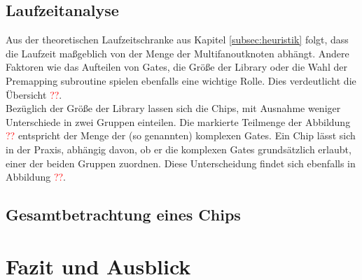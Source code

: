 \documentclass[11pt, a4paper, german]{article}
\begin{document}
 
 \subsection{Laufzeitanalyse}
 \label{subsec:laufzeitanalyse}
Aus der theoretischen Laufzeitschranke aus Kapitel \ref{subsec:heuristik} folgt, dass die Laufzeit maßgeblich von der Menge der Multifanoutknoten abhängt. Andere Faktoren wie das Aufteilen von Gates, die Größe der Library oder die Wahl der Premapping subroutine spielen ebenfalls eine wichtige Rolle. Dies verdeutlicht die Übersicht \textcolor{red}{??}.\\
 Bezüglich der Größe der Library lassen sich die Chips, mit Ausnahme weniger Unterschiede in zwei Gruppen einteilen. Die markierte Teilmenge der Abbildung \textcolor{red}{??} entspricht der Menge der (so genannten) komplexen Gates. Ein Chip lässt sich in der Praxis, abhängig davon, ob er die komplexen Gates grundsätzlich erlaubt, einer der beiden Gruppen zuordnen. Diese Unterscheidung findet sich ebenfalls in Abbildung \textcolor{red}{??}.

\subsection{Gesamtbetrachtung eines Chips}

\section{Fazit und Ausblick}
\label{sec:fazit_und_ausblick}
	

\newpage
{}
\nocite{*}
\renewcommand{\refname}{8 \,\, Literaturverzeichnis}
{ \footnotesize


}
\end{document}
